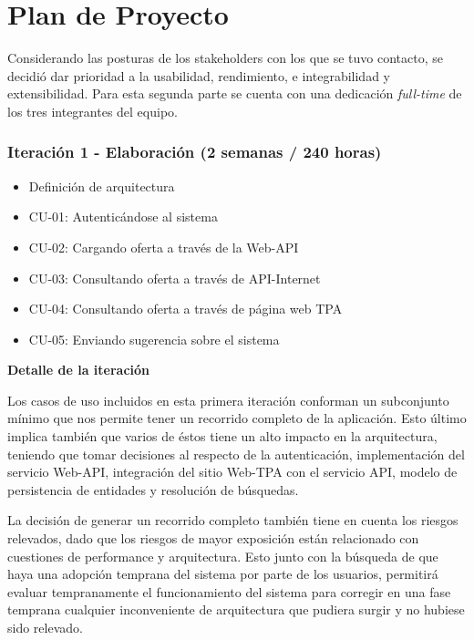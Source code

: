 \section*{Plan de Proyecto}

Considerando las posturas de los stakeholders con los que se tuvo contacto, se decidi\'o dar prioridad a la usabilidad, rendimiento, e integrabilidad y extensibilidad. Para esta segunda parte se cuenta con una dedicaci\'on \textit{full-time} de los tres integrantes del equipo.

\subsubsection{Iteraci\'on 1 - Elaboraci\'on (2 semanas / 240 horas)}	
	
	\begin{itemize}
		  \item Definici\'on de arquitectura
		  \item CU-01: Autentic\'andose al sistema
		  \item CU-02: Cargando oferta a trav\'es de la Web-API
		  \item CU-03: Consultando oferta a trav\'es de API-Internet
		  \item CU-04: Consultando oferta a trav\'es de p\'agina web TPA
		  \item CU-05: Enviando sugerencia sobre el sistema
	\end{itemize}

\textbf{Detalle de la iteración}

	Los casos de uso incluidos en esta primera iteraci\'on conforman un subconjunto m\'inimo que nos permite tener un recorrido completo de la aplicación. Esto \'ultimo implica tambi\'en que varios de \'estos tiene un alto impacto en la arquitectura, teniendo que tomar decisiones al respecto de la autenticaci\'on, implementaci\'on del servicio Web-API, integraci\'on del sitio Web-TPA con el servicio API, modelo de persistencia de entidades y resoluci\'on de b\'usquedas.
	
	La decisión de generar un recorrido completo también tiene en cuenta los riesgos relevados, dado que los riesgos de mayor exposición están relacionado con cuestiones de performance y arquitectura. Esto junto con la búsqueda de que haya una  adopción temprana del sistema por parte de los usuarios, permitirá evaluar tempranamente el funcionamiento del sistema para corregir en una fase temprana cualquier inconveniente de arquitectura que pudiera surgir y no hubiese sido relevado.
	
